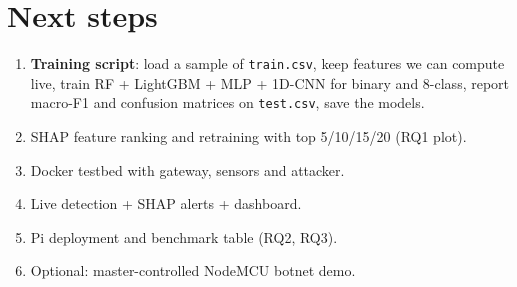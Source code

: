 \documentclass[11pt]{article}
\begin{document}
\section{Next steps}
\begin{enumerate}
\item \textbf{Training script}: load a sample of \texttt{train.csv}, keep features we can compute live, train RF + LightGBM + MLP + 1D-CNN for binary and 8-class, report macro-F1 and confusion matrices on \texttt{test.csv}, save the models.
\item SHAP feature ranking and retraining with top 5/10/15/20 (RQ1 plot).
\item Docker testbed with gateway, sensors and attacker.
\item Live detection + SHAP alerts + dashboard.
\item Pi deployment and benchmark table (RQ2, RQ3).
\item Optional: master-controlled NodeMCU botnet demo.
\end{enumerate}

\newpage
\end{document}
